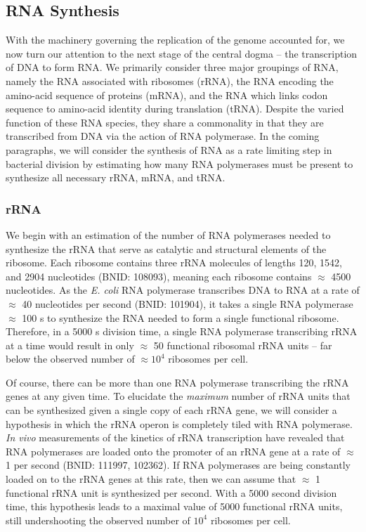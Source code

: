 \subsection{RNA Synthesis}\label{sec:RNA_synthesis}
With the machinery governing the replication of the genome accounted for, we
now turn our attention to the next stage of the central dogma -- the
transcription of DNA to form RNA. We primarily consider three major groupings
of RNA, namely the RNA associated with ribosomes (rRNA), the RNA encoding the
amino-acid sequence of proteins (mRNA), and the RNA which links codon
sequence to amino-acid identity during translation (tRNA). Despite the varied
function of these RNA species, they share a commonality in that they are
transcribed from DNA via the action of RNA polymerase. In the coming
paragraphs, we will consider the synthesis of RNA as a rate limiting step in
bacterial division by estimating how many RNA polymerases must be present to
synthesize all necessary rRNA, mRNA, and tRNA.

\subsubsection{rRNA}
We begin with an estimation of the number of RNA polymerases needed to
synthesize the rRNA that serve as catalytic and structural elements of the
ribosome. Each ribosome contains three rRNA molecules of lengths 120, 1542,
and 2904 nucleotides (BNID: 108093), meaning each ribosome
contains $\approx$ 4500 nucleotides. As the \textit{E. coli} RNA polymerase
transcribes DNA to RNA at a rate of $\approx$ 40 nucleotides per second
(BNID: 101904), it takes a single RNA polymerase
$\approx$ 100 s to synthesize the RNA needed to form a single functional ribosome.
Therefore, in a 5000 s division time, a single RNA polymerase transcribing
rRNA at a time would result in only $\approx$ 50 functional ribosomal rRNA
units -- far below the observed number of $\approx 10^4$ ribosomes per cell.

Of course, there can be more than one RNA polymerase transcribing the rRNA genes
at any given time. To elucidate the \textit{maximum} number of rRNA units that can
be synthesized given a single copy of each rRNA gene, we will consider a
hypothesis in which the rRNA operon is completely tiled with RNA polymerase.
\textit{In vivo} measurements of the kinetics of rRNA transcription have revealed that
RNA polymerases are loaded onto the promoter of an rRNA gene at a rate of
$\approx$ 1 per second (BNID: 111997, 102362). If RNA
polymerases are being constantly loaded on to the rRNA genes at this rate,
then we can assume that $\approx$ 1 functional rRNA unit is
synthesized per second. With a 5000 second division time, this hypothesis
leads to a maximal value of 5000 functional rRNA units, still undershooting
the observed number of $10^4$ ribosomes per cell.

